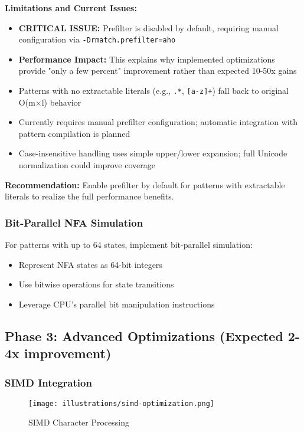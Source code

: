 \documentclass[11pt,a4paper]{article}
\begin{document}
\textbf{Limitations and Current Issues:}

\begin{itemize}
\item \textbf{CRITICAL ISSUE:} Prefilter is disabled by default, requiring manual configuration via \texttt{-Drmatch.prefilter=aho}
\item \textbf{Performance Impact:} This explains why implemented optimizations provide "only a few percent" improvement rather than expected 10-50x gains
\item Patterns with no extractable literals (e.g., \texttt{.*}, \texttt{[a-z]+}) fall back to original O(m×l) behavior
\item Currently requires manual prefilter configuration; automatic integration with pattern compilation is planned
\item Case-insensitive handling uses simple upper/lower expansion; full Unicode normalization could improve coverage
\end{itemize}

\textbf{Recommendation:} Enable prefilter by default for patterns with extractable literals to realize the full performance benefits.

\subsubsection{Bit-Parallel NFA Simulation}

For patterns with up to 64 states, implement bit-parallel simulation:
\begin{itemize}
\item Represent NFA states as 64-bit integers
\item Use bitwise operations for state transitions
\item Leverage CPU's parallel bit manipulation instructions
\end{itemize}

\subsection{Phase 3: Advanced Optimizations (Expected 2-4x improvement)}

\subsubsection{SIMD Integration}

\begin{figure}[htbp]
\centering
\texttt{[image: illustrations/simd-optimization.png]}
\caption{SIMD Character Processing}
\label{fig:simd}
\end{figure}
\end{document}
